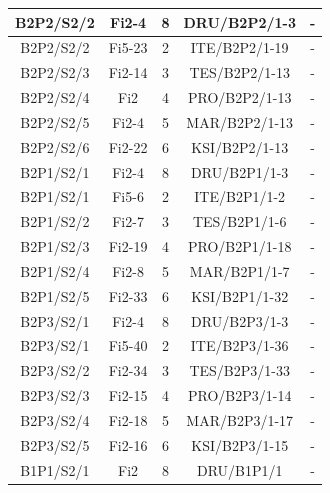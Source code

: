 \documentclass[a4paper,12pt]{extarticle}  %
\begin{document}
\begin{longtable}[c]{|c|c|c|c|c|}
	B2P2/S2/2 & Fi2-4   & 8 & DRU/B2P2/1-3  & -           \\ \hline %
	B2P2/S2/2 & Fi5-23  & 2 & ITE/B2P2/1-19 & -           \\ \hline %
	B2P2/S2/3 & Fi2-14  & 3 & TES/B2P2/1-13 & -           \\ \hline %
	B2P2/S2/4 & Fi2     & 4 & PRO/B2P2/1-13 & -           \\ \hline %
	B2P2/S2/5 & Fi2-4   & 5 & MAR/B2P2/1-13 & -           \\ \hline %
	B2P2/S2/6 & Fi2-22  & 6 & KSI/B2P2/1-13 & -           \\ \hline %
	B2P1/S2/1 & Fi2-4   & 8 & DRU/B2P1/1-3  & -           \\ \hline %
	B2P1/S2/1 & Fi5-6   & 2 & ITE/B2P1/1-2  & -           \\ \hline %
	B2P1/S2/2 & Fi2-7   & 3 & TES/B2P1/1-6  & -           \\ \hline %
	B2P1/S2/3 & Fi2-19  & 4 & PRO/B2P1/1-18 & -           \\ \hline %
	B2P1/S2/4 & Fi2-8   & 5 & MAR/B2P1/1-7  & -           \\ \hline %
	B2P1/S2/5 & Fi2-33  & 6 & KSI/B2P1/1-32 & -           \\ \hline %
	B2P3/S2/1 & Fi2-4   & 8 & DRU/B2P3/1-3  & -           \\ \hline %
	B2P3/S2/1 & Fi5-40  & 2 & ITE/B2P3/1-36 & -           \\ \hline %
	B2P3/S2/2 & Fi2-34  & 3 & TES/B2P3/1-33 & -           \\ \hline %
	B2P3/S2/3 & Fi2-15  & 4 & PRO/B2P3/1-14 & -           \\ \hline %
	B2P3/S2/4 & Fi2-18  & 5 & MAR/B2P3/1-17 & -           \\ \hline %
	B2P3/S2/5 & Fi2-16  & 6 & KSI/B2P3/1-15 & -           \\ \hline %
	B1P1/S2/1 & Fi2     & 8 & DRU/B1P1/1    & -           \\ \hline %

\end{longtable}
\end{document}
